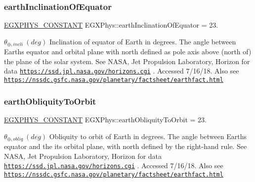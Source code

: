 \subsubsection{\texorpdfstring{earth\+Inclination\+Of\+Equator}{earthInclinationOfEquator}}
{\footnotesize\ttfamily \mbox{\hyperlink{group___e_g_x_phys-_constants-_macros_ga76980d288494ce1714c9ac68a95ba702}{E\+G\+X\+P\+H\+Y\+S\+\_\+\+C\+O\+N\+S\+T\+A\+NT}} E\+G\+X\+Phys\+::earth\+Inclination\+Of\+Equator = 23.}

$ \theta_{\oplus,incli} \ (deg)$ Inclination of equator of Earth in degrees. The angle between Earth\textquotesingle{}s equator and orbital plane with north defined as pole axis above (north of) the plane of the solar system. See N\+A\+SA, Jet Propulsion Laboratory, Horizon for data \href{https://ssd.jpl.nasa.gov/horizons.cgi}{\tt https\+://ssd.\+jpl.\+nasa.\+gov/horizons.\+cgi} . Accessed 7/16/18. Also see \href{https://nssdc.gsfc.nasa.gov/planetary/factsheet/earthfact.html}{\tt https\+://nssdc.\+gsfc.\+nasa.\+gov/planetary/factsheet/earthfact.\+html} \mbox{\label{group___e_g_x_phys-_constants-_astrophysics-_solar_system-_earth-_orbit_gacb42020ec6e5cf996fa8a81f753efbb2}} 
\subsubsection{\texorpdfstring{earth\+Obliquity\+To\+Orbit}{earthObliquityToOrbit}}
{\footnotesize\ttfamily \mbox{\hyperlink{group___e_g_x_phys-_constants-_macros_ga76980d288494ce1714c9ac68a95ba702}{E\+G\+X\+P\+H\+Y\+S\+\_\+\+C\+O\+N\+S\+T\+A\+NT}} E\+G\+X\+Phys\+::earth\+Obliquity\+To\+Orbit = 23.}

$ \theta_{\oplus,obliq} \ (deg)$ Obliquity to orbit of Earth in degrees. The angle between Earth\textquotesingle{}s equator and the it\textquotesingle{}s orbital plane, with north defined by the right-\/hand rule. See N\+A\+SA, Jet Propulsion Laboratory, Horizon for data \href{https://ssd.jpl.nasa.gov/horizons.cgi}{\tt https\+://ssd.\+jpl.\+nasa.\+gov/horizons.\+cgi} . Accessed 7/16/18. Also see \href{https://nssdc.gsfc.nasa.gov/planetary/factsheet/earthfact.html}{\tt https\+://nssdc.\+gsfc.\+nasa.\+gov/planetary/factsheet/earthfact.\+html} \mbox{\label{group___e_g_x_phys-_constants-_astrophysics-_solar_system-_earth-_orbit_ga09b479dff54ecdc92386453498b86904}} 
